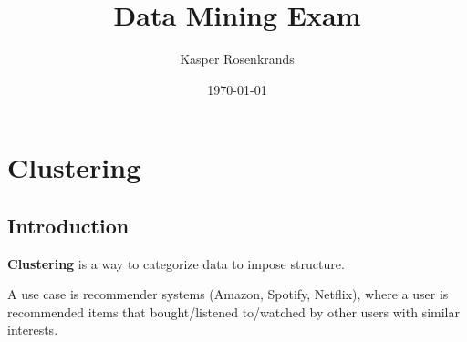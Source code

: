 \documentclass[aspectratio=169,10pt]{beamer}
\title{Data Mining Exam}
\date{\today}
\author{
  Kasper Rosenkrands
}
\institute[
] %
{%
  Aalborg University\\
  Denmark
  
}
\begin{document}
{\aauwavesbg%
\begin{frame} %
  \titlepage
\end{frame}}


\section{Clustering}


\subsection{Introduction}
\begin{frame}{\secname}{\subsecname}
  \textbf{Clustering} is a way to categorize data to impose structure.
  
  A use case is recommender systems (Amazon, Spotify, Netflix), where a user is recommended items that bought/listened to/watched by other users with similar interests.
\end{frame}
\end{document}
